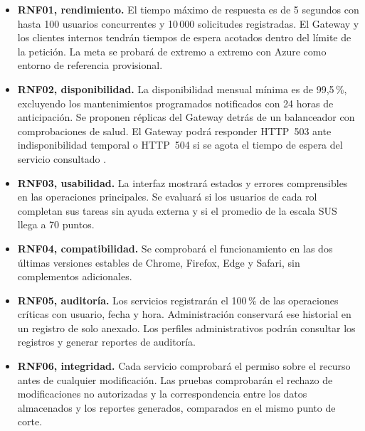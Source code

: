 \begin{itemize}
    \item \textbf{RNF01, rendimiento.} El tiempo máximo de respuesta
    es de 5 segundos con hasta 100 usuarios concurrentes y
    10\,000 solicitudes registradas. El Gateway y los clientes
    internos tendrán tiempos de espera acotados dentro del límite
    de la petición. La meta se probará de extremo a extremo con Azure
    como entorno de referencia provisional.

    \item \textbf{RNF02, disponibilidad.} La disponibilidad mensual
    mínima es de 99{,}5\,\%, excluyendo los mantenimientos programados
    notificados con 24 horas de anticipación. Se proponen réplicas del
    Gateway detrás de un balanceador con comprobaciones de salud.
    El Gateway podrá responder HTTP~503 ante indisponibilidad temporal
    o HTTP~504 si se agota el tiempo de espera del servicio consultado
    \cite{sgra-http-semantics}.

    \item \textbf{RNF03, usabilidad.} La interfaz mostrará estados y
    errores comprensibles en las operaciones principales. Se evaluará
    si los usuarios de cada rol completan sus tareas sin ayuda externa
    y si el promedio de la escala SUS llega a 70 puntos.

    \item \textbf{RNF04, compatibilidad.} Se comprobará el
    funcionamiento en las dos últimas versiones estables de Chrome,
    Firefox, Edge y Safari, sin complementos adicionales.

    \item \textbf{RNF05, auditoría.} Los servicios registrarán el
    100\,\% de las operaciones críticas con usuario, fecha y hora.
    Administración conservará ese historial en un registro de solo
    anexado. Los perfiles administrativos podrán consultar los
    registros y generar reportes de auditoría.

    \item \textbf{RNF06, integridad.} Cada servicio comprobará el
    permiso sobre el recurso antes de cualquier modificación. Las
    pruebas comprobarán el rechazo de modificaciones no autorizadas
    y la correspondencia entre los datos almacenados y los reportes
    generados, comparados en el mismo punto de corte.
\end{itemize}
